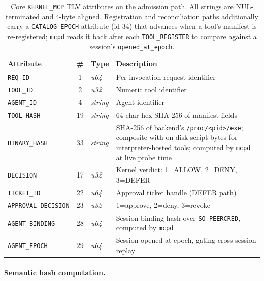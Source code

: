 \begin{table}[H]
\centering
\caption{Core \texttt{KERNEL\_\allowbreak MCP} TLV attributes on the admission path. All strings are NUL-terminated and 4-byte aligned. Registration and reconciliation paths additionally carry a \texttt{CATALOG\_\allowbreak EPOCH} attribute (id 34) that advances when a tool's manifest is re-registered; \texttt{mcpd} reads it back after each \texttt{TOOL\_REGISTER} to compare against a session's \texttt{opened\_\allowbreak at\_\allowbreak epoch}.}
\label{tab:netlink-attrs-full}
\small
\begin{tabular}{@{}lcl p{5.8cm}@{}}
\toprule
\textbf{Attribute} & \textbf{\#} & \textbf{Type} & \textbf{Description} \\
\midrule
\texttt{REQ\_ID}                & 1  & \textit{u64}    & Per-invocation request identifier \\
\texttt{TOOL\_ID}               & 2  & \textit{u32}    & Numeric tool identifier \\
\texttt{AGENT\_ID}              & 4  & \textit{string} & Agent identifier \\
\texttt{TOOL\_HASH}             & 19 & \textit{string} & 64-char hex SHA-256 of manifest fields \\
\texttt{BINARY\_\allowbreak HASH}       & 33 & \textit{string} & SHA-256 of backend's \texttt{/proc/<pid>/exe}; composite with on-disk script bytes for interpreter-hosted tools; computed by \texttt{mcpd} at live probe time \\
\texttt{DECISION}               & 17 & \textit{u32}    & Kernel verdict: 1=ALLOW, 2=DENY, 3=DEFER \\
\texttt{TICKET\_ID}             & 22 & \textit{u64}    & Approval ticket handle (DEFER path) \\
\texttt{APPROVAL\_\allowbreak DECISION} & 23 & \textit{u32}    & 1=approve, 2=deny, 3=revoke \\
\texttt{AGENT\_\allowbreak BINDING}     & 28 & \textit{u64}    & Session binding hash over \texttt{SO\_PEERCRED}, computed by \texttt{mcpd} \\
\texttt{AGENT\_\allowbreak EPOCH}       & 29 & \textit{u64}    & Session opened-at epoch, gating cross-session replay \\
\bottomrule
\end{tabular}
\end{table}

\paragraph{Semantic hash computation.}

